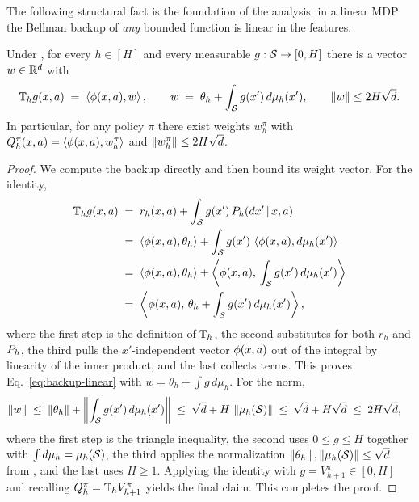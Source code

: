 The following structural fact is the foundation of the analysis: in a linear
MDP the Bellman backup of \emph{any} bounded function is linear in the features.

\begin{fact}\label{fac:value-linear}
Under , for every $h\in[H]$ and every measurable
$g:\mathcal{S}\to[0,H]$ there is a vector $w\in\mathbb{R}^d$ with
\begin{align}\label{eq:backup-linear}
\mathbb{T}_h g(x,a) \;=\; \left\langle \phi(x,a), w \right\rangle,
\qquad
w \;=\; \theta_h + \int_{\mathcal{S}} g(x')\,d\mu_h(x'),
\qquad
\left\| w \right\|\le 2H\sqrt d .
\end{align}
In particular, for any policy $\pi$ there exist weights $w_h^\pi$ with
$Q_h^\pi(x,a)=\left\langle \phi(x,a), w_h^\pi \right\rangle$ and $\left\| w_h^\pi \right\|\le 2H\sqrt d$.
\end{fact}

\begin{proof}
We compute the backup directly and then bound its weight vector. For the
identity,
\begin{align*}
\mathbb{T}_h g(x,a)
&\;=\; r_h(x,a) + \int_{\mathcal{S}} g(x')\,P_h(dx'\,|\,x,a) \\
&\;=\; \left\langle \phi(x,a), \theta_h \right\rangle + \int_{\mathcal{S}} g(x')\,\left\langle \phi(x,a), d\mu_h(x') \right\rangle \\
&\;=\; \left\langle \phi(x,a), \theta_h \right\rangle + \left\langle \phi(x,a),\, \int_{\mathcal{S}} g(x')\,d\mu_h(x') \right\rangle \\
&\;=\; \left\langle \phi(x,a),\, \theta_h + \int_{\mathcal{S}} g(x')\,d\mu_h(x') \right\rangle,
\end{align*}
where the first step is the definition of $\mathbb{T}_h$, the second substitutes
 for both $r_h$ and $P_h$, the third pulls the
$x'$-independent vector $\phi(x,a)$ out of the integral by linearity of the
inner product, and the last collects terms. This proves
Eq.~\eqref{eq:backup-linear} with $w=\theta_h+\int g\,d\mu_h$. For the norm,
\begin{align*}
\left\| w \right\|
&\;\le\; \left\| \theta_h \right\| + \left\| \int_{\mathcal{S}} g(x')\,d\mu_h(x') \right\|
\;\le\; \sqrt d + H\,\left\| \mu_h(\mathcal{S}) \right\|
\;\le\; \sqrt d + H\sqrt d
\;\le\; 2H\sqrt d,
\end{align*}
where the first step is the triangle inequality, the second uses
$0\le g\le H$ together with $\int d\mu_h=\mu_h(\mathcal{S})$, the third applies the
normalization $\left\| \theta_h \right\|,\left\| \mu_h(\mathcal{S}) \right\|\le\sqrt d$ from
, and the last uses $H\ge1$. Applying the identity with
$g=V_{h+1}^\pi\in[0,H]$ and recalling $Q_h^\pi=\mathbb{T}_h V_{h+1}^\pi$ yields the
final claim. This completes the proof.
\end{proof}
